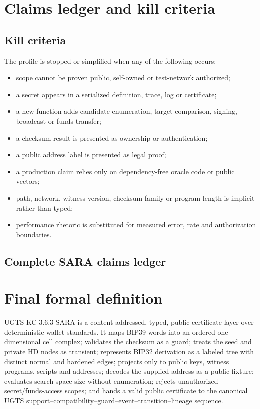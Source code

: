 \documentclass[10pt,a4paper]{article}
\begin{document}
\section{Claims ledger and kill criteria}

\subsection{Kill criteria}
The profile is stopped or simplified when any of the following occurs:
\begin{itemize}
\item scope cannot be proven public, self-owned or test-network authorized;
\item a secret appears in a serialized definition, trace, log or certificate;
\item a new function adds candidate enumeration, target comparison, signing, broadcast or funds transfer;
\item a checksum result is presented as ownership or authentication;
\item a public address label is presented as legal proof;
\item a production claim relies only on dependency-free oracle code or public vectors;
\item path, network, witness version, checksum family or program length is implicit rather than typed;
\item performance rhetoric is substituted for measured error, rate and authorization boundaries.
\end{itemize}

\subsection{Complete SARA claims ledger}
\begin{landscape}
\small

\end{landscape}

\section{Final formal definition}

\begin{decisionbox}
UGTS-KC 3.6.3 SARA is a content-addressed, typed, public-certificate layer over deterministic-wallet standards. It maps BIP39 words into an ordered one-dimensional cell complex; validates the checksum as a guard; treats the seed and private HD nodes as transient; represents BIP32 derivation as a labeled tree with distinct normal and hardened edges; projects only to public keys, witness programs, scripts and addresses; decodes the supplied address as a public fixture; evaluates search-space size without enumeration; rejects unauthorized secret/funds-access scopes; and hands a valid public certificate to the canonical UGTS support--compatibility--guard--event--transition--lineage sequence.
\end{decisionbox}
\end{document}
